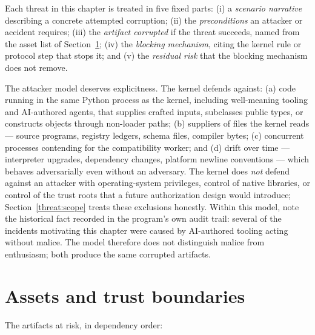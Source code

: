 \begin{definition}\label{threat:def:format}
Each threat in this chapter is treated in five fixed parts: (i) a \emph{scenario narrative} describing a concrete attempted corruption; (ii) the \emph{preconditions} an attacker or accident requires; (iii) the \emph{artifact corrupted} if the threat succeeds, named from the asset list of Section~\ref{threat:assets}; (iv) the \emph{blocking mechanism}, citing the kernel rule or protocol step that stops it; and (v) the \emph{residual risk} that the blocking mechanism does not remove.
\end{definition}

\begin{remark}\label{threat:rem:attacker}
The attacker model deserves explicitness. The kernel defends against: (a) code running in the same Python process as the kernel, including well-meaning tooling and AI-authored agents, that supplies crafted inputs, subclasses public types, or constructs objects through non-loader paths; (b) suppliers of files the kernel reads --- source programs, registry ledgers, schema files, compiler bytes; (c) concurrent processes contending for the compatibility worker; and (d) drift over time --- interpreter upgrades, dependency changes, platform newline conventions --- which behaves adversarially even without an adversary. The kernel does \emph{not} defend against an attacker with operating-system privileges, control of native libraries, or control of the trust roots that a future authorization design would introduce; Section~\ref{threat:scope} treats these exclusions honestly. Within this model, note the historical fact recorded in the program's own audit trail: several of the incidents motivating this chapter were caused by AI-authored tooling acting without malice. The model therefore does not distinguish malice from enthusiasm; both produce the same corrupted artifacts.
\end{remark}

\section{Assets and trust boundaries}\label{threat:assets}

The artifacts at risk, in dependency order:

